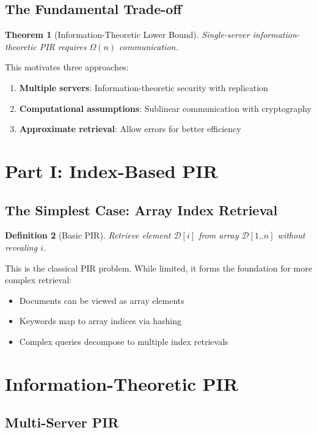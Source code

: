 \documentclass[11pt,final]{article}
\newcommand{\DB}{\mathcal{D}}
\newtheorem{theorem}{Theorem}[section]
\newtheorem{definition}[theorem]{Definition}
\begin{document}
\subsection{The Fundamental Trade-off}

\begin{theorem}[Information-Theoretic Lower Bound]
Single-server information-theoretic PIR requires $\Omega(n)$ communication.
\end{theorem}

This motivates three approaches:
\begin{enumerate}
    \item \textbf{Multiple servers}: Information-theoretic security with replication
    \item \textbf{Computational assumptions}: Sublinear communication with cryptography
    \item \textbf{Approximate retrieval}: Allow errors for better efficiency
\end{enumerate}

\section{Part I: Index-Based PIR}

\subsection{The Simplest Case: Array Index Retrieval}

\begin{definition}[Basic PIR]
Retrieve element $\DB[i]$ from array $\DB[1..n]$ without revealing $i$.
\end{definition}

This is the classical PIR problem. While limited, it forms the foundation for more complex retrieval:
\begin{itemize}
    \item Documents can be viewed as array elements
    \item Keywords map to array indices via hashing
    \item Complex queries decompose to multiple index retrievals
\end{itemize}

\section{Information-Theoretic PIR}

\subsection{Multi-Server PIR}
\end{document}
